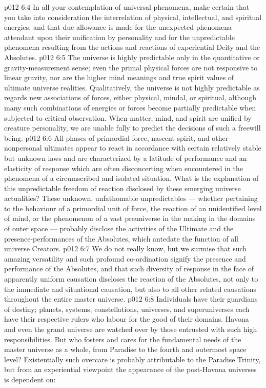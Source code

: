 \vs p012 6:4 In all your contemplation of universal phenomena, make certain that you take into consideration the interrelation of physical, intellectual, and spiritual energies, and that due allowance is made for the unexpected phenomena attendant upon their unification by personality and for the unpredictable phenomena resulting from the actions and reactions of experiential Deity and the Absolutes.
\vs p012 6:5 The universe is highly predictable only in the quantitative or gravity\hyp{}measurement sense; even the primal physical forces are not responsive to linear gravity, nor are the higher mind meanings and true spirit values of ultimate universe realities. Qualitatively, the universe is not highly predictable as regards new associations of forces, either physical, mindal, or spiritual, although many such combinations of energies or forces become partially predictable when subjected to critical observation. When matter, mind, and spirit are unified by creature personality, we are unable fully to predict the decisions of such a freewill being.
\vs p012 6:6 \pc All phases of primordial force, nascent spirit, and other nonpersonal ultimates appear to react in accordance with certain relatively stable but unknown laws and are characterized by a latitude of performance and an elasticity of response which are often disconcerting when encountered in the phenomena of a circumscribed and isolated situation. What is the explanation of this unpredictable freedom of reaction disclosed by these emerging universe actualities? These unknown, unfathomable unpredictables --- whether pertaining to the behaviour of a primordial unit of force, the reaction of an unidentified level of mind, or the phenomenon of a vast preuniverse in the making in the domains of outer space --- probably disclose the activities of the Ultimate and the presence\hyp{}performances of the Absolutes, which antedate the function of all universe Creators.
\vs p012 6:7 We do not really know, but we surmise that such amazing versatility and such profound co\hyp{}ordination signify the presence and performance of the Absolutes, and that such diversity of response in the face of apparently uniform causation discloses the reaction of the Absolutes, not only to the immediate and situational causation, but also to all other related causations throughout the entire master universe.
\vs p012 6:8 \pc Individuals have their guardians of destiny; planets, systems, constellations, universes, and superuniverses each have their respective rulers who labour for the good of their domains. Havona and even the grand universe are watched over by those entrusted with such high responsibilities. But who fosters and cares for the fundamental needs of the master universe as a whole, from Paradise to the fourth and outermost space level? Existentially such overcare is probably attributable to the Paradise Trinity, but from an experiential viewpoint the appearance of the post\hyp{}Havona universes is dependent on:
